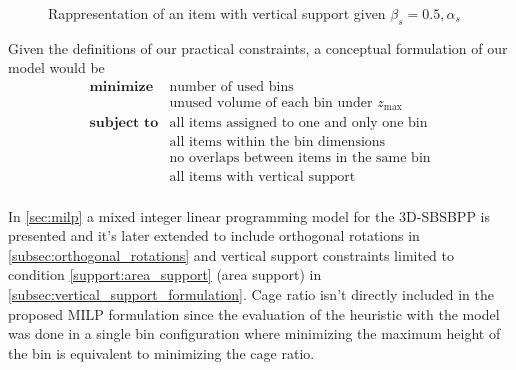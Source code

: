 \begin{figure}[H]
    \scalebox{0.55}{%
    
    }
    \caption{Rappresentation of an item with vertical support given $\beta_s = 0.5, \alpha_s$}
    \label{fig:support}
\end{figure}

\newpage
Given the definitions of our practical constraints, a conceptual formulation of our model would be
\begin{eqnarray*}
    \textbf{minimize} & \text{number of used bins} \\
                        & \text{unused volume of each bin under $z_\text{max}$} \\
    \textbf{subject to} & \text{all items assigned to one and only one bin} \\
                                      & \text{all items within the bin dimensions} \\
                                      & \text{no overlaps between items in the same bin} \\
                                      & \text{all items with vertical support} \\
\end{eqnarray*}

In \cref{sec:milp} a mixed integer linear programming model for the 3D-SBSBPP is presented and it's later extended to include orthogonal rotations in \cref{subsec:orthogonal_rotations} and vertical support constraints limited to condition \ref{support:area_support} (area support) in \cref{subsec:vertical_support_formulation}.
Cage ratio isn't directly included in the proposed MILP formulation since the evaluation of the heuristic with the model was done in a single bin configuration where minimizing the maximum height of the bin is equivalent to minimizing the cage ratio.

